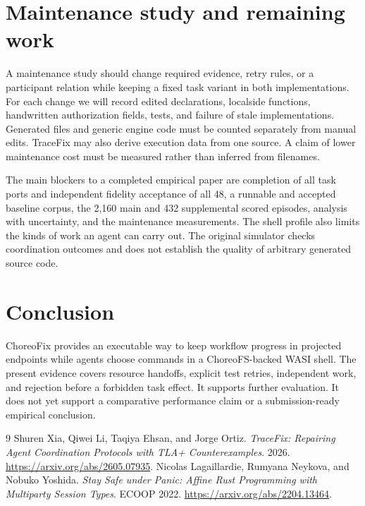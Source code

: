 \documentclass[10pt]{article}
\begin{document}
\section{Maintenance study and remaining work}
A maintenance study should change required evidence, retry rules, or a
participant relation while keeping a fixed task variant in both implementations.
For each change we will record edited declarations, localside functions,
handwritten authorization fields, tests, and failure of stale implementations.
Generated files and generic engine code must be counted separately from manual
edits. TraceFix may also derive execution data from one source. A claim of lower
maintenance cost must be measured rather than inferred from filenames.

The main blockers to a completed empirical paper are completion of all task
ports and independent fidelity acceptance of all 48, a runnable and accepted
baseline corpus, the 2,160 main and 432 supplemental scored episodes, analysis
with uncertainty, and the
maintenance measurements. The shell profile also limits the kinds of work an
agent can carry out. The original simulator checks coordination outcomes and
does not establish the quality of arbitrary generated source code.

\section{Conclusion}
ChoreoFix provides an executable way to keep workflow progress in projected
endpoints while agents choose commands in a ChoreoFS-backed WASI shell.
The present evidence covers resource handoffs, explicit test retries,
independent work, and rejection before a forbidden task effect. It supports
further evaluation. It does not yet support a comparative performance claim or
a submission-ready empirical conclusion.

\begin{thebibliography}{9}
 Shuren Xia, Qiwei Li, Taqiya Ehsan, and Jorge Ortiz.
\emph{TraceFix: Repairing Agent Coordination Protocols with TLA+ Counterexamples}.
2026. \url{https://arxiv.org/abs/2605.07935}.
 Nicolas Lagaillardie, Rumyana Neykova, and Nobuko Yoshida.
\emph{Stay Safe under Panic: Affine Rust Programming with Multiparty Session Types}.
ECOOP 2022. \url{https://arxiv.org/abs/2204.13464}.
\end{thebibliography}
\end{document}

